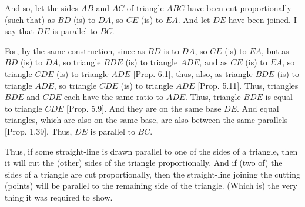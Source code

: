\begin{Parallel}{}{}
{And so, let the sides $AB$ and $AC$ of triangle $ABC$ have been cut proportionally (such that)
as $BD$ (is) to $DA$, so $CE$ (is) to $EA$. And let $DE$ have been joined. I say that
$DE$ is parallel to $BC$.

For, by the same construction, since as $BD$ is to $DA$, so $CE$ (is) to $EA$, but
as $BD$ (is) to $DA$, so triangle $BDE$ (is) to triangle $ADE$, and as $CE$
(is) to $EA$, so triangle $CDE$ (is) to triangle $ADE$ [Prop. 6.1], thus, also,  as triangle $BDE$ (is) to triangle
$ADE$, so triangle $CDE$ (is) to triangle $ADE$ [Prop. 5.11]. Thus, triangles $BDE$ and $CDE$ each have the same ratio to $ADE$. Thus, triangle $BDE$ is equal to triangle $CDE$ [Prop. 5.9].
And they are on the same base $DE$. And equal triangles, which are also on the same base, are also between the same parallels  [Prop. 1.39]. Thus,
$DE$ is parallel to $BC$.

Thus, if some straight-line is drawn parallel to one of the
sides of a triangle, then it will cut the (other) sides of the triangle
proportionally. And if (two of) the sides of a triangle are cut proportionally, then
the straight-line joining the cutting (points) will be parallel to the remaining side of the
triangle. (Which is) the very thing it was required to show.}
\end{Parallel}

